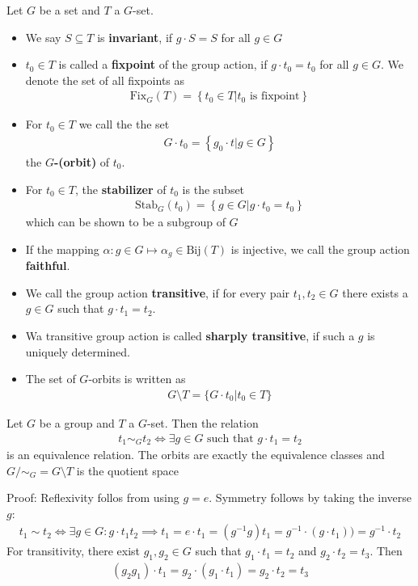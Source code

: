 \begin{definition}[]
Let $G$ be a set and $T$ a $G$-set. 
\begin{itemize}
	\item We say $S \subseteq T$ is \textbf{invariant}, if $g \cdot S = S$ for all $g \in G$
	\item $t_0 \in T$ is called a \textbf{fixpoint} of the group action, if $g \cdot t_0 = t_0$ for all $g \in G$. We denote the set of all fixpoints as
		\begin{align*}
			\text{Fix}_G(T) = \left\{t_0 \in T \big\vert t_0 \text{ is fixpoint}\right\}
		\end{align*}
	\item For $t_0 \in T$ we call the the set 
		\begin{align*}
			G \cdot t_0 = \left\{g_0 \cdot t \big\vert g \in G\right\}
		\end{align*}
		the \textbf{$G$-(orbit)} of $t_0$.
	\item For $t_0 \in T$, the \textbf{stabilizer} of $t_0$ is the subset
		\begin{align*}
			\text{Stab}_G(t_0) = \left\{g \in G \big\vert g \cdot t_0 = t_0\right\}
		\end{align*}
		which can be shown to be a subgroup of $G$
	\item If the mapping $\alpha: g \in G \mapsto \alpha_g \in \text{Bij}(T)$ is injective, we call the group action \textbf{faithful}.
	\item We call the group action \textbf{transitive}, if for every pair $t_1,t_2 \in G$ there exists a $g \in G$ such that $g \cdot t_1 = t_2$.
	\item Wa transitive group action is called \textbf{sharply transitive}, if such a $g$ is uniquely determined.
	\item The set of $G$-orbits is written as
		\begin{align*}
			G \setminus T = \{G \cdot t_0 \big\vert t_0 \in T\}
		\end{align*}
\end{itemize}
\end{definition}


\begin{lemma}[]
Let $G$ be a group and $T$ a $G$-set. Then the relation
\begin{align*}
	t_1 \sim_G t_2 \iff \exists g \in G \text{ such that } g \cdot t_1 = t_2
\end{align*}
is an equivalence relation. The orbits are exactly the equivalence classes and $G/\sim_G = G \setminus T$ is the quotient space
\end{lemma}
Proof: Reflexivity follos from using $g = e$. Symmetry follows by taking the inverse $g$:
\begin{align*}
	t_1 \sim t_2 \iff \exists g \in G: g \cdot t_1  t_2 \implies t_1 = e \cdot t_1 = (g^{-1}g)t_1 = g^{-1}\cdot (g \cdot t_1)) = g^{-1} \cdot t_2
\end{align*}
For transitivity, there exist $g_1,g_2 \in G$ such that $g_1 \cdot t_1 = t_2$ and $g_2 \cdot t_2 = t_3$. Then
\begin{align*}
	(g_2g_1) \cdot t_1 = g_2 \cdot (g_1 \cdot t_1) = g_2 \cdot t_2 = t_3
\end{align*}

